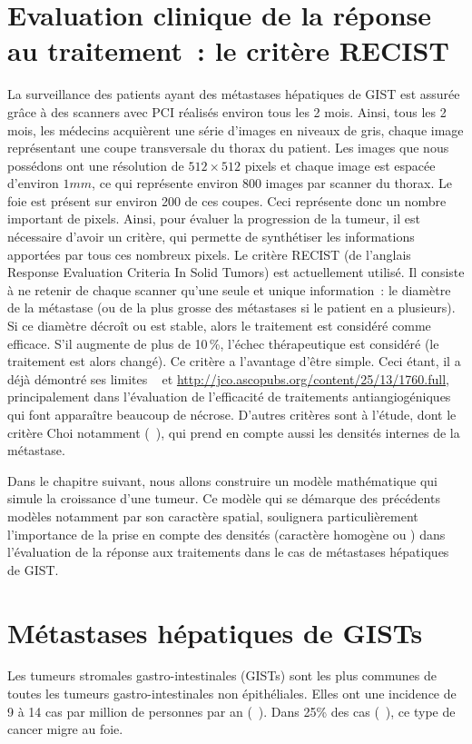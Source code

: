 \documentclass[main.tex]{subfiles}
\begin{document}
\section{Evaluation clinique de la réponse au traitement~: le critère RECIST}
La surveillance des patients ayant des métastases hépatiques de GIST est assurée grâce à des scanners avec PCI réalisés environ tous les 2 mois. Ainsi, tous les 2 mois, les médecins acquièrent une série d'images en niveaux de gris, chaque image représentant une coupe transversale du thorax du patient. Les images que nous possédons ont une résolution de $512\times512$ pixels et chaque image est espacée d'environ $1mm$, ce qui représente environ 800 images par scanner du thorax. 
Le foie est présent sur environ 200 de ces coupes. 
Ceci représente donc un nombre important de pixels. 
Ainsi, pour évaluer la progression de la tumeur, il est nécessaire d'avoir un critère, qui permette de synthétiser les informations apportées par tous ces nombreux pixels. 
Le critère RECIST (de l'anglais Response Evaluation Criteria In Solid Tumors) est actuellement utilisé. 
Il consiste à ne retenir de chaque scanner qu'une seule et unique information~: le diamètre de la métastase (ou de la plus grosse des métastases si le patient en a plusieurs). Si ce diamètre décroît ou est stable, alors le traitement est considéré comme efficace. S'il augmente de plus de 10\,\%, %
 l'échec thérapeutique est considéré %
 (le traitement est alors changé). 
 Ce critère  a l'avantage d'être simple. 
Ceci étant, il a déjà démontré ses limites \cf~\cite{benjamin2007we} et \url{http://jco.ascopubs.org/content/25/13/1760.full}, principalement dans l'évaluation de l'efficacité de traitements antiangiogéniques qui font apparaître  beaucoup de nécrose. 
D'autres critères sont à l'étude, dont le critère Choi notamment (\cf~\cite{choi2008response}), qui prend en compte aussi les densités internes de la métastase. 


Dans le chapitre suivant, nous allons construire un modèle mathématique qui simule la croissance d'une tumeur. Ce modèle qui se démarque des précédents modèles notamment par son caractère spatial, soulignera particulièrement l'importance de la prise en compte des densités (caractère homogène ou \heterogene) dans l'évaluation de la réponse aux traitements dans le cas de métastases hépatiques de GIST.

\section{Métastases hépatiques de GISTs}
Les tumeurs stromales gastro-intestinales (GISTs) sont les plus communes de toutes les tumeurs 
gastro-intestinales non épithéliales. Elles ont une incidence de 9 à 14 cas par million de personnes par an (\cf~\cite{Nilsson2005}). 
Dans 25\% des cas (\cf~\cite{dematteo2000}), ce type 
de cancer migre au foie. 
\end{document}
